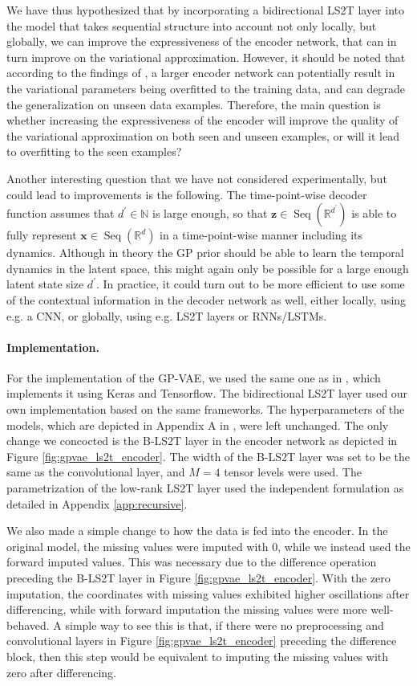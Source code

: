\documentclass{article} \usepackage{iclr2021_conference,times}
\newcommand{\R}{\mathbb{R}}
\newcommand{\bx}{\mathbf{x}}
\newcommand{\bz}{\mathbf{z}}
\newcommand{\NN}{\mathbb{N}}
\newcommand{\Seq}[1]{\operatorname{Seq}(#1)}
\theoremstyle{plain}
\theoremstyle{definition}
\begin{document}
We have thus hypothesized that by incorporating a bidirectional LS2T layer into the model that takes sequential structure into account not only locally, but globally, we can improve the expressiveness of the encoder network, that can in turn improve on the variational approximation. However, it should be noted that according to the findings of \citet{Cremer2018inference}, a larger encoder network can potentially result in the variational parameters being overfitted to the training data, and can degrade the generalization on unseen data examples. Therefore, the main question is whether increasing the expressiveness of the encoder will improve the quality of the variational approximation on both seen and unseen examples, or will it lead to overfitting to the seen examples?  

Another interesting question that we have not considered experimentally, but could lead to improvements is the following. The time-point-wise decoder function assumes that $d^\prime \in \NN$ is large enough, so that $\bz \in \Seq{\R^{d^\prime}}$ is able to fully represent $\bx \in \Seq{\R^d}$ in a time-point-wise manner including its dynamics. Although in theory the GP prior should be able to learn the temporal dynamics in the latent space, this might again only be possible for a large enough latent state size $d^\prime$. In practice, it could turn out to be more efficient to use some of the contextual information in the decoder network as well, either locally, using e.g. a CNN, or globally, using e.g. LS2T layers or RNNs/LSTMs.

\paragraph{Implementation.}
For the implementation of the GP-VAE, we used the same one as in \citet{fortuin2019gpvae}, which implements it using Keras and Tensorflow. The bidirectional LS2T layer used our own implementation based on the same frameworks. The hyperparameters of the models, which are depicted in Appendix A in \citet{fortuin2019gpvae}, were left unchanged. The only change we concocted is the B-LS2T layer in the encoder network as depicted in Figure \ref{fig:gpvae_ls2t_encoder}. The width of the B-LS2T layer was set to be the same as the convolutional layer, and $M=4$ tensor levels were used. The parametrization of the low-rank LS2T layer used the independent formulation as detailed in Appendix \ref{app:recursive}.

We also made a simple change to how the data is fed into the encoder. In the original model, the missing values were imputed with $0$, while we instead used the forward imputed values. This was necessary due to the difference operation preceding the B-LS2T layer in Figure \ref{fig:gpvae_ls2t_encoder}. With the zero imputation, the coordinates with missing values exhibited higher oscillations after differencing, while with forward imputation the missing values were more well-behaved. A simple way to see this is that, if there were no preprocessing and convolutional layers in Figure \ref{fig:gpvae_ls2t_encoder} preceding the difference block, then this step would be equivalent to imputing the missing values with zero after differencing.
\end{document}
